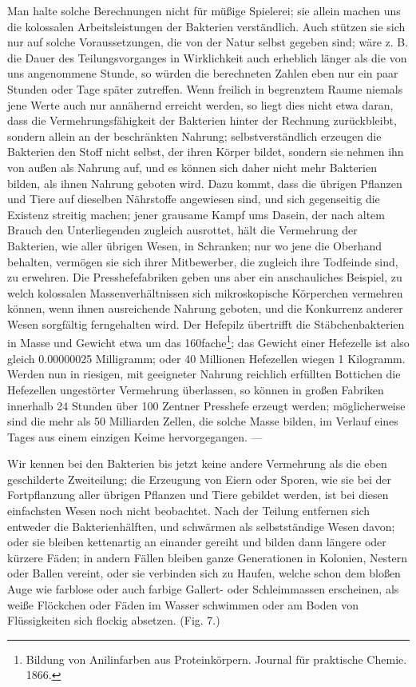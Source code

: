 \documentclass[a4paper, 11pt, oneside, english]{article}
\begin{document}
Man halte solche Berechnungen nicht für müßige Spielerei; sie allein machen uns die kolossalen Arbeitsleistungen der Bakterien verständlich. Auch stützen sie sich nur auf solche Voraussetzungen, die von der Natur selbst gegeben sind; wäre z. B. die Dauer des Teilungsvorganges in Wirklichkeit auch erheblich länger als die von uns angenommene Stunde, so würden die berechneten Zahlen eben nur ein paar Stunden oder Tage später zutreffen. Wenn freilich in begrenztem Raume niemals jene Werte auch nur annähernd erreicht werden, so liegt dies nicht etwa daran, dass die Vermehrungsfähigkeit der Bakterien hinter der Rechnung zurückbleibt, sondern allein an der beschränkten Nahrung; selbstverständlich erzeugen die Bakterien den Stoff nicht selbst, der ihren Körper bildet, sondern sie nehmen ihn von außen als Nahrung auf, und es können sich daher nicht mehr Bakterien bilden, als ihnen Nahrung geboten wird. Dazu kommt, dass die übrigen Pflanzen und Tiere auf dieselben Nährstoffe angewiesen sind, und sich gegenseitig die Existenz streitig machen; jener grausame Kampf ums Dasein, der nach altem Brauch den Unterliegenden zugleich ausrottet, hält die Vermehrung der Bakterien, wie aller übrigen Wesen, in Schranken; nur wo jene die Oberhand behalten, vermögen sie sich ihrer Mitbewerber, die zugleich ihre Todfeinde sind, zu erwehren. Die Presshefefabriken geben uns aber ein anschauliches Beispiel, zu welch kolossalen Massenverhältnissen sich mikroskopische Körperchen vermehren können, wenn ihnen ausreichende Nahrung geboten, und die Konkurrenz anderer Wesen sorgfältig ferngehalten wird. Der Hefepilz übertrifft die Stäbchenbakterien in Masse und Gewicht etwa um das 160fache\footnote{Bildung von Anilinfarben aus Proteinkörpern. Journal für praktische Chemie. 1866.}; das Gewicht einer Hefezelle ist also gleich 0.00000025 Milligramm; oder 40 Millionen Hefezellen wiegen 1 Kilogramm. Werden nun in riesigen, mit geeigneter Nahrung reichlich erfüllten Bottichen die Hefezellen ungestörter Vermehrung überlassen, so können in großen Fabriken innerhalb 24 Stunden über 100 Zentner Presshefe erzeugt werden; möglicherweise sind die mehr als 50 Milliarden Zellen, die solche Masse bilden, im Verlauf eines Tages aus einem einzigen Keime hervorgegangen. ---

Wir kennen bei den Bakterien bis jetzt keine andere Vermehrung als die eben geschilderte Zweiteilung; die Erzeugung von Eiern oder Sporen, wie sie bei der Fortpflanzung aller übrigen Pflanzen und Tiere gebildet werden, ist bei diesen einfachsten Wesen noch nicht beobachtet. Nach der Teilung entfernen sich entweder die Bakterienhälften, und schwärmen als selbstständige Wesen davon; oder sie bleiben kettenartig an einander gereiht und bilden dann längere oder kürzere Fäden; in andern Fällen bleiben ganze Generationen in Kolonien, Nestern oder Ballen vereint, oder sie verbinden sich zu Haufen, welche schon dem bloßen Auge wie farblose oder auch farbige Gallert- oder Schleimmassen erscheinen, als weiße Flöckchen oder Fäden im Wasser schwimmen oder am Boden von Flüssigkeiten sich flockig absetzen. (Fig. 7.)
\end{document}
